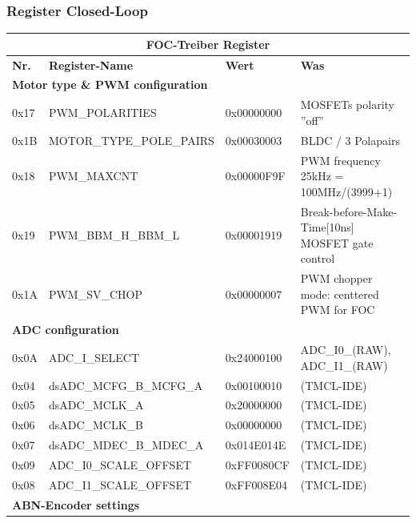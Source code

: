 \subsubsection{Register Closed-Loop}\label{Appendix:ABN_Register}

\begin{table}[H]
\begin{tabularx}{\linewidth}{|l|l|l|X|}
\hline
\multicolumn{4}{|c|}{\textbf{FOC-Treiber Register}}               \\ \hline
\textbf{Nr. }& \textbf{Register-Name   }   & \textbf{Wert }      & \textbf{Was} \\ \hline
\multicolumn{4}{|l|}{\textbf{Motor type \&  PWM configuration}}        \\ \hline
0x17         & PWM\_POLARITIES             & 0x00000000 & MOSFETs polarity ''off''    \\ \hline
0x1B         & MOTOR\_TYPE\_POLE\_PAIRS & 0x00030003 & BLDC / 3 Polapairs    \\ \hline
0x18         & PWM\_MAXCNT                 & 0x00000F9F & PWM frequency 25kHz = 100MHz/(3999+1)   \\ \hline
0x19         & PWM\_BBM\_H\_BBM\_L         & 0x00001919 & Break-before-Make-Time[10ns] MOSFET gate control \\ \hline
0x1A         & PWM\_SV\_CHOP               & 0x00000007 & PWM chopper mode: centtered PWM for FOC \\ \hline
\multicolumn{4}{|l|}{\textbf{ADC configuration}}                       \\ \hline
0x0A         & ADC\_I\_SELECT              & 0x24000100 & ADC\_I0\_(RAW), ADC\_I1\_(RAW)    \\ \hline
0x04         & dsADC\_MCFG\_B\_MCFG\_A     & 0x00100010 & (TMCL-IDE)    \\ \hline
0x05         & dsADC\_MCLK\_A              & 0x20000000 & (TMCL-IDE)    \\ \hline
0x06         & dsADC\_MCLK\_B              & 0x00000000 & (TMCL-IDE)    \\ \hline
0x07         & dsADC\_MDEC\_B\_MDEC\_A     & 0x014E014E & (TMCL-IDE)    \\ \hline
0x09         & ADC\_I0\_SCALE\_OFFSET      & 0xFF0080CF & (TMCL-IDE)    \\ \hline
0x08         & ADC\_I1\_SCALE\_OFFSET      & 0xFF008E04 & (TMCL-IDE)    \\ \hline
\multicolumn{4}{|l|}{\textbf{ABN-Encoder settings}}           \\ \hline

\end{tabularx}
\end{table}
